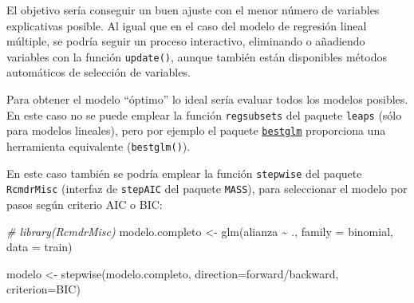 \documentclass[
  spanish,
]{book}
\newenvironment{Shaded}{\begin{snugshade}}{\end{snugshade}}
\newcommand{\AttributeTok}[1]{\textcolor[rgb]{0.77,0.63,0.00}{#1}}
\newcommand{\CommentTok}[1]{\textcolor[rgb]{0.56,0.35,0.01}{\textit{#1}}}
\newcommand{\FunctionTok}[1]{\textcolor[rgb]{0.00,0.00,0.00}{#1}}
\newcommand{\NormalTok}[1]{#1}
\newcommand{\OtherTok}[1]{\textcolor[rgb]{0.56,0.35,0.01}{#1}}
\newcommand{\SpecialCharTok}[1]{\textcolor[rgb]{0.00,0.00,0.00}{#1}}
\newcommand{\StringTok}[1]{\textcolor[rgb]{0.31,0.60,0.02}{#1}}
\theoremstyle{break}
\theoremstyle{definition}
\theoremstyle{definition}
\theoremstyle{definition}
\theoremstyle{definition}
\theoremstyle{remark}
\begin{document}
El objetivo sería conseguir un buen ajuste con el menor número de variables explicativas posible.
Al igual que en el caso del modelo de regresión lineal múltiple, se podría seguir un proceso interactivo, eliminando o añadiendo variables con la función \texttt{update()}, aunque también están disponibles métodos automáticos de selección de variables.

Para obtener el modelo ``óptimo'' lo ideal sería evaluar todos los modelos posibles.
En este caso no se puede emplear la función \texttt{regsubsets} del paquete \texttt{leaps} (sólo para modelos lineales),
pero por ejemplo el paquete
\href{https://cran.r-project.org/web/packages/bestglm/vignettes/bestglm.pdf}{\texttt{bestglm}}
proporciona una herramienta equivalente (\texttt{bestglm()}).

En este caso también se podría emplear la función \texttt{stepwise} del paquete \texttt{RcmdrMisc} (interfaz de \texttt{stepAIC} del paquete \texttt{MASS}), para seleccionar el modelo por pasos según criterio AIC o BIC:

\begin{Shaded}
\begin{Highlighting}[]
\CommentTok{\# library(RcmdrMisc)}
\NormalTok{modelo.completo }\OtherTok{\textless{}{-}} \FunctionTok{glm}\NormalTok{(alianza }\SpecialCharTok{\textasciitilde{}}\NormalTok{ ., }\AttributeTok{family =}\NormalTok{ binomial, }\AttributeTok{data =}\NormalTok{ train)}

\NormalTok{modelo }\OtherTok{\textless{}{-}} \FunctionTok{stepwise}\NormalTok{(modelo.completo, }\AttributeTok{direction=}\StringTok{\textquotesingle{}forward/backward\textquotesingle{}}\NormalTok{, }\AttributeTok{criterion=}\StringTok{\textquotesingle{}BIC\textquotesingle{}}\NormalTok{)}
\end{Highlighting}
\end{Shaded}
\end{document}
